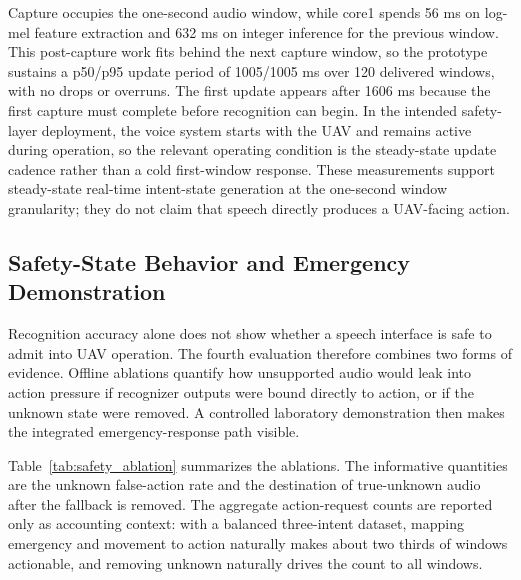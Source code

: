Capture occupies the one-second audio window, while core1 spends 56 ms on log-mel feature extraction and 632 ms on integer inference for the previous window. This post-capture work fits behind the next capture window, so the prototype sustains a p50/p95 update period of 1005/1005 ms over 120 delivered windows, with no drops or overruns. The first update appears after 1606 ms because the first capture must complete before recognition can begin. In the intended safety-layer deployment, the voice system starts with the UAV and remains active during operation, so the relevant operating condition is the steady-state update cadence rather than a cold first-window response. These measurements support steady-state real-time intent-state generation at the one-second window granularity; they do not claim that speech directly produces a UAV-facing action.

\subsection{Safety-State Behavior and Emergency Demonstration}

Recognition accuracy alone does not show whether a speech interface is safe to admit into UAV operation. The fourth evaluation therefore combines two forms of evidence. Offline ablations quantify how unsupported audio would leak into action pressure if recognizer outputs were bound directly to action, or if the unknown state were removed. A controlled laboratory demonstration then makes the integrated emergency-response path visible.

Table~\ref{tab:safety_ablation} summarizes the ablations. The informative quantities are the unknown false-action rate and the destination of true-unknown audio after the fallback is removed. The aggregate action-request counts are reported only as accounting context: with a balanced three-intent dataset, mapping emergency and movement to action naturally makes about two thirds of windows actionable, and removing unknown naturally drives the count to all windows.

